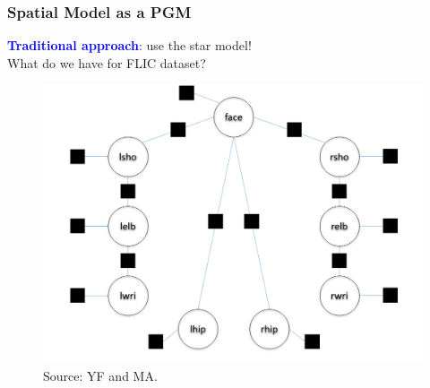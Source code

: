 \documentclass{beamer}
\newcommand\blue[1]{\textcolor{blue}{\textbf{#1}}}
\begin{document}
	\begin{frame}[t]
        \frametitle{Spatial Model as a PGM}
        \begin{center}
			\blue{Traditional approach}: use the star model!\\
			What do we have for FLIC dataset?
            \begin{figure}[htbp] %
            \includegraphics[scale=0.28]{star_model.png} \\
            \scriptsize Source: YF and MA.
            \end{figure}
        \end{center}
    \end{frame}
    
\end{document}
